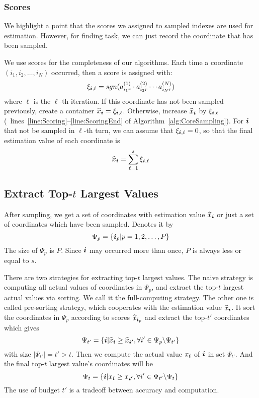 \documentclass[letterpaper]{article}
\newcommand{\Sca}[3]{{#1}^{(#2)}_{i_#2#3}}%
\newcommand{\anr}[2]{\Sca{a}{#1}{#2}}
\newcommand{\score}[1]{\xi_{\V{i},#1}}
\newcommand{\V}[1]{{\bm{{\MakeLowercase{#1}}}}}
\newcommand{\AlgLines}[3]{lines~\ref{line:#2}--\ref{line:#3} of Algorithm~\ref{alg:#1}}
\newcommand{\coord}{(i_1,i_2,\ldots,i_N)}
\newcommand{\predx}{\widehat{x}_{\V{i}}}
\begin{document}
\subsubsection{Scores}
We highlight a point that the scores we assigned to sampled indexes are used for estimation.
However, for finding task, we can just record the coordinate that has been sampled.

We use scores for the completeness of our algorithms.
Each time a coordinate $\coord $ occurred, then a score is assigned with:
\[
\score{\ell}  = sgn(\anr{1}{r}\cdot\anr{2}{r}\cdots\anr{N}{r})
\]
where $\ell$ is the $\ell$-th iteration.
If this coordinate has not been sampled previously,
create a container $\predx = \score{\ell}$.
Otherwise, increase $\predx$ by $\score{\ell}$
(~\AlgLines{CoreSampling}{Scoring}{ScoringEnd}).
For $\V{i}$ that not be sampled in $\ell$-th turn,
we can assume that $\score{\ell}=0$,
so that the final estimation value of each coordinate is
\begin{equation}\label{eq:score}
\predx = \sum_{\ell=1}^{s} \score{\ell}
\end{equation}

\subsection{Extract Top-$t$ Largest Values}
After sampling, we get a set of coordinates with estimation value $\predx$
or just a set of coordinates which have been sampled.
Denotes it by
\[
    \Psi_p = \{\V{i}_p|p = 1,2,\ldots,P\}
\]
The size of $\Psi_p$ is $P$.
Since $\V{i}$ may occurred more than once, $P$ is always less or equal to $s$.

There are two strategies for extracting top-$t$ largest values.
The naive strategy is computing all actual values of coordinates in $\Psi_p$,
and extract the top-$t$ largest actual values via sorting.
We call it the full-computing strategy.
The other one is called pre-sorting strategy,
which cooperates with the estimation value $\predx$.
It sort the coordinates in $\Psi_p$ according to scores $\widehat{x}_{\V{i}_p}$
and extract the top-$t'$ coordinates which gives
\[
    \Psi_{t'} = \{ \V{i} | \predx \geq \widehat{x}_{\V{i'}},
                           \forall i'\in \Psi_{p} \backslash \Psi_{t'}
                \}
\]  with size $|\Psi_{t'}| = t'>t$.
Then we compute the actual value $x_{\V{i}}$ of $\V{i}$ in set $\Psi_{t'}$.
And the final top-$t$ largest value's coordinates will be
\[
    \Psi_{t} =
                \{ \V{i} | x_{\V{i}}\geq x_{\V{i'}},
                           \forall i' \in \Psi_{t'} \backslash \Psi_{t}
                \}
\]
The use of budget $t'$ is a tradeoff between accuracy and computation.
\end{document}
